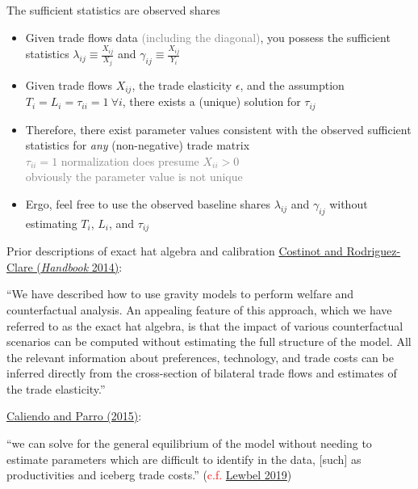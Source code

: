 \documentclass[11pt,notes=hide,aspectratio=169]{beamer}
\begin{document}
\begin{frame}{The sufficient statistics are observed shares}
\begin{itemize}
\item
Given trade flows data \textcolor{gray}{(including the diagonal)},
you possess the sufficient statistics
$\lambda_{ij} \equiv \frac{X_{ij}}{X_j}$ and $\gamma_{ij} \equiv \frac{X_{ij}}{Y_i}$
\item
Given trade flows $X_{ij}$, the trade elasticity $\epsilon$, and
the assumption $T_i = L_i = \tau_{ii} = 1 \ \forall i$,
there exists a (unique) solution for $\tau_{ij}$
\item
Therefore,
there exist parameter values consistent with the observed sufficient statistics
for \textit{any} (non-negative) trade matrix
\\ \textcolor{gray}{$\tau_{ii} = 1$ normalization does presume $X_{ii} > 0$ \\ obviously the parameter value is not unique}
\item
Ergo, feel free to use the observed baseline shares $\lambda_{ij}$ and $\gamma_{ij}$
without estimating $T_i$, $L_i$, and $\tau_{ij}$
\end{itemize}
\end{frame}
\begin{frame}{Prior descriptions of exact hat algebra and calibration}
\href{https://doi.org/10.1016/B978-0-444-54314-1.00004-5}{Costinot and Rodriguez-Clare (\textit{Handbook} 2014)}:\\
{\small
``We have described how to use gravity models to perform welfare and counterfactual analysis. An appealing feature of this approach, which we have referred to as the exact hat algebra, is that the impact of various counterfactual scenarios can be computed without estimating the full structure of the model. All the relevant information about preferences, technology, and trade costs can be inferred directly from the cross-section of bilateral trade flows and estimates of the trade elasticity.''
\par}
\vspace{3mm}
\href{https://doi.org/10.1093/restud/rdu035}{Caliendo and Parro (2015)}:\\
{\small
``we can solve for the general equilibrium of the model without needing to estimate parameters which are difficult to identify in the data, [such] as productivities and iceberg trade costs.''
(\textcolor{red}{c.f.} \href{https://www.aeaweb.org/articles?id=10.1257/jel.20181361}{Lewbel 2019})
\par}
\end{frame}
\end{document}
